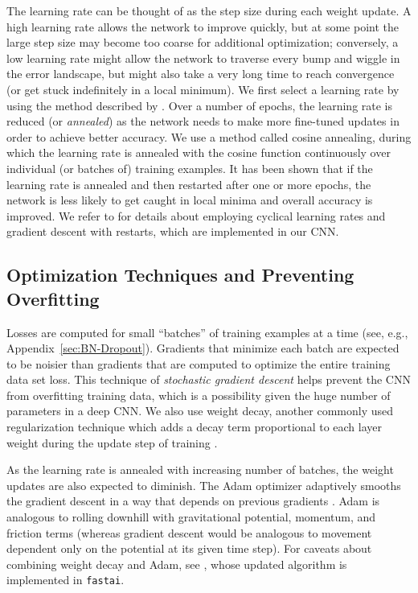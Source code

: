 \documentclass[fleqn,usenatbib]{mnras}
\begin{document}
The learning rate can be thought of as the step size during each weight update.
A high learning rate allows the network to improve quickly, but at some point the large step size may become too coarse for additional optimization; conversely, a low learning rate might allow the network to traverse every bump and wiggle in the error landscape, but might also take a very long time to reach convergence (or get stuck indefinitely in a local minimum).
We first select a learning rate by using the method described by \cite{CLR}.
Over a number of epochs, the learning rate is reduced (or \textit{annealed}) as the network needs to make more fine-tuned updates in order to achieve better accuracy.
We use a method called cosine annealing, during which the learning rate is annealed with the cosine function continuously over individual (or batches of) training examples.
It has been shown that if the learning rate is annealed and then restarted after one or more epochs, the network is less likely to get caught in local minima and overall accuracy is improved.
We refer to \cite{SGDR} for details about employing cyclical learning rates and gradient descent with restarts, which are implemented in our CNN.

\subsection{Optimization Techniques and Preventing Overfitting} \label{sec:optimization}

Losses are computed for small ``batches'' of training examples at a time (see, e.g., Appendix~\ref{sec:BN-Dropout}).
Gradients that minimize each batch are expected to be noisier than gradients that are computed to optimize the entire training data set loss.
This technique of \textit{stochastic gradient descent} helps prevent the CNN from overfitting training data, which is a possibility given the huge number of parameters in a deep CNN.
We also use weight decay, another commonly used regularization technique which adds a decay term proportional to each layer weight during the update step of training .

As the learning rate is annealed with increasing number of batches, the weight updates are also expected to diminish.
The Adam optimizer adaptively smooths the gradient descent in a way that depends on previous gradients \citep{Kingma2014}.
Adam is analogous to rolling downhill with gravitational potential, momentum, and friction terms (whereas gradient descent would be analogous to movement dependent only on the potential at its given time step).
For caveats about combining weight decay and Adam, see \cite{Loshchilov2017}, whose updated algorithm is implemented in \texttt{fastai}.
\end{document}
